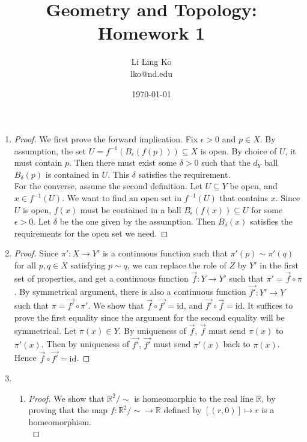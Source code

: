 \documentclass{article}
\begin{document}
\title{Geometry and Topology: Homework 1}
\author{Li Ling Ko\\ lko@nd.edu}
\date{\today}
\maketitle

\begin{enumerate}
  \item
    \begin{proof}
      We first prove the forward implication. Fix $\epsilon>0$ and $p\in X$.
      By assumption, the set $U=f^{-1}(B_\epsilon(f(p)))\subseteq X$ is open.
      By choice of $U$, it must contain $p$. Then there must exist
      some $\delta>0$ such that the $d_Y$ ball $B_\delta(p)$ is contained in
      $U$. This $\delta$ satisfies the requirement. \\

      For the converse, assume the second definition. Let $U\subseteq Y$ be
      open, and $x\in f^{-1}(U)$. We want to find an open set in $f^{-1}(U)$
      that contains $x$. Since $U$ is open, $f(x)$ must be contained in a
      ball $B_\epsilon(f(x))\subseteq U$ for some $\epsilon>0$. Let $\delta$
      be the one given by the assumption. Then $B_\delta(x)$ satisfies the
      requirements for the open set we need.
    \end{proof}
  \item
    \begin{proof}
      Since $\pi':X\rightarrow Y'$ is a continuous function such that
      $\pi'(p)\sim\pi'(q)$ for all $p,q\in X$ satisfying $p\sim q$, we can
      replace the role of $Z$ by $Y'$ in the first set of properties, and
      get a continuous function $\vec{f}:Y\rightarrow Y'$ such that
      $\pi'=\vec{f}\circ\pi$. By symmetrical argument, there is also a
      continuous function $\vec{f'}:Y'\rightarrow Y$ such that
      $\pi=\vec{f'}\circ\pi'$. We show that
      $\vec{f}\circ\vec{f'}=\text{id}$, and
      $\vec{f'}\circ\vec{f}=\text{id}$. It suffices to prove the first
      equality since the argument for the second equality will be
      symmetrical. Let $\pi(x)\in Y$. By uniqueness of $\vec{f}$, $\vec{f}$
      must send $\pi(x)$ to $\pi'(x)$. Then by uniqueness of $\vec{f'}$,
      $\vec{f'}$ must send $\pi'(x)$ back to $\pi(x)$. Hence
      $\vec{f}\circ\vec{f'}=\text{id}$.
    \end{proof}
  \item
    \begin{enumerate}
      \item
        \begin{proof}
          We show that $\mathbb{R}^2/\sim$ is homeomorphic to the real line
          $\mathbb{R}$, by proving that the map
          $f:\mathbb{R}^2/\sim\rightarrow\mathbb{R}$ defined by
          $[(r,0)]\mapsto r$ is a homeomorphism. \\


\end{proof}
\end{enumerate}
\end{enumerate}
\end{document}
